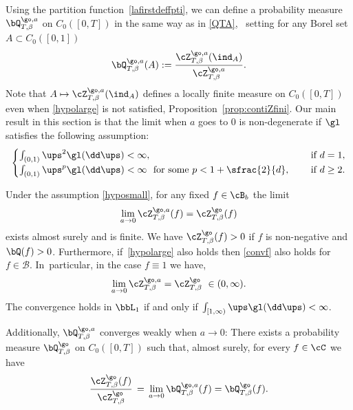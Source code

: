  Using the partition function~\eqref{lafirstdeffpti}, we can define a probability measure $\bQ^{\go,a}_{T,\beta}$ on $C_0([0,T])$ in the same way as in \eqref{QTA}, \ie \ setting for any Borel set $A\subset C_0([0,1])$ \,
\[
\bQ^{\go,a}_{T,\beta}(A):= \frac{\cZ^{\go,a}_{T,\beta}(\ind_{A})}{ \cZ^{\go,a}_{T,\beta} }.
\]
Note that $A\mapsto \cZ^{\go,a}_{T,\beta}(\ind_{A})$ defines a locally finite measure on $C_0([0,T])$ even when \eqref{hypolarge} is not satisfied, \cf Proposition~\ref{prop:contiZfini}.
Our main result in this section is that the limit when $a$ goes to $0$ is non-degenerate if $\gl$ satisfies the following assumption:
\begin{equation}\label{hyposmall}
\begin{cases}
\int_{(0,1)} \ups^{2} \gl(\dd \ups)<\infty, \quad &\text{ if } d=1,\\
\int_{(0,1)} \ups^{p} \gl(\dd \ups)<\infty \ \text{ for some } p<1+\sfrac{2}{d}, \quad &\text{ if } d\ge 2.
\end{cases}
\end{equation}

\begin{theorem}\label{thm:zalpha}
Under the assumption \eqref{hyposmall}, for any fixed $f\in \cB_b$ the limit
\begin{equation}\label{convf}
\lim_{a\to 0}\cZ^{\go,a}_{T,\beta}(f)= \cZ^{\go}_{T,\beta}(f)
\end{equation}
exists almost surely and is finite. We have $\cZ^{\go}_{T,\beta}(f)>0$ if $f$ is non-negative and $\bQ(f)>0$.
Furthermore, if~\eqref{hypolarge} also holds then \eqref{convf} also holds for $f\in \mathcal B$. In~particular, in the case $f\equiv 1$ we have,
\begin{equation}\label{convparty}
\lim_{a\to 0}\cZ^{\go,a}_{T,\beta}= \cZ^{\go}_{T,\beta} \ \in (0,\infty).
\end{equation}
The convergence holds in $\bbL_1$ if and only if $\int_{[1,\infty)} \ups \gl(\dd \ups)<\infty$.

 Additionally, $\bQ^{\go,a}_{T,\beta}$ converges weakly when $a\to 0$: There exists a probability measure $\bQ^{\go}_{T,\beta}$ on $C_0([0,T])$ such that, almost surely, for every
$f\in \cC$ we have
\begin{equation}\label{lescontis}
\frac{ \cZ^{\go}_{T,\beta}(f)}{ \cZ^{\go}_{T,\beta}}\, =\, \lim_{a\to 0}\bQ^{\go,a}_{T,\beta}(f)= \bQ^{\go}_{T,\beta}(f).
\end{equation}
\end{theorem}

